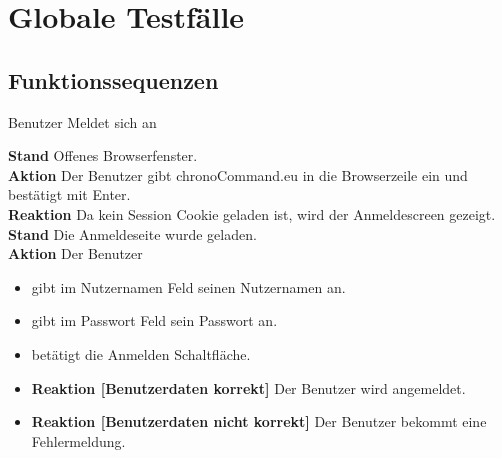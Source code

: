 \section{Globale Testfälle}

\subsection{Funktionssequenzen}
\begin{requirements}
	 Benutzer Meldet sich an
	\begin{requirements}
  			    \textbf{Stand} Offenes Browserfenster. \\
  			    \textbf{Aktion} Der Benutzer gibt chronoCommand.eu in die Browserzeile ein und bestätigt mit Enter. \\
  			    \textbf{Reaktion} Da kein Session Cookie geladen ist, wird der Anmeldescreen gezeigt.
  			    \textbf{Stand} Die Anmeldeseite wurde geladen.\\
                \textbf{Aktion} Der Benutzer
                    \begin{itemize}
                        \item gibt im Nutzernamen Feld seinen Nutzernamen an.
                        \item gibt im Passwort Feld sein Passwort an.
                        \item betätigt die Anmelden Schaltfläche.
                    \end{itemize}
                \begin{itemize}
			\item \textbf{Reaktion [Benutzerdaten korrekt]} Der Benutzer wird angemeldet.
			\item \textbf{Reaktion [Benutzerdaten nicht korrekt]} Der Benutzer bekommt eine Fehlermeldung.
                \end{itemize}


\end{requirements}
\end{requirements}
